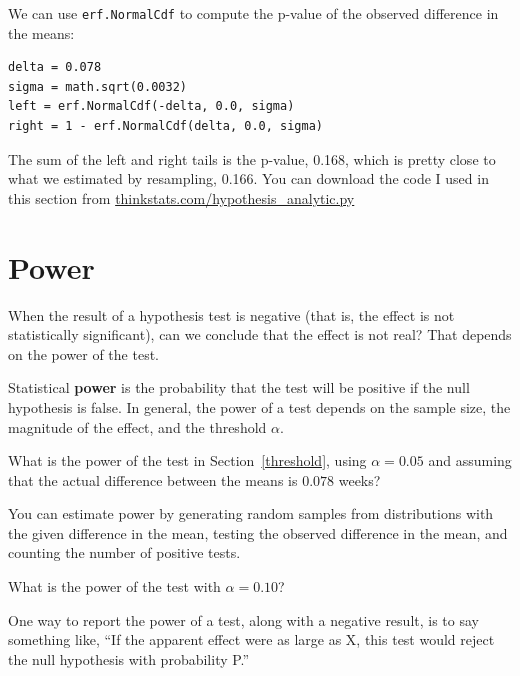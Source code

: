 \documentclass[12pt]{book}
\begin{document}

We can use {\tt erf.NormalCdf} to compute the p-value of the observed 
difference in the means:

\begin{verbatim}
delta = 0.078
sigma = math.sqrt(0.0032)
left = erf.NormalCdf(-delta, 0.0, sigma)
right = 1 - erf.NormalCdf(delta, 0.0, sigma)
\end{verbatim}

The sum of the left and right tails is the p-value, 0.168, which is
pretty close to what we estimated by resampling, 0.166. 
You can download the code I used in this section from
\url{thinkstats.com/hypothesis_analytic.py}



\section{Power}

When the result of a hypothesis test is negative (that is, the effect is
not statistically significant), can we conclude that the effect is not
real?  That depends on the power of the test.

Statistical {\bf power} is the probability that the test will be
positive if the null hypothesis is false.  In general, the power of a
test depends on the sample size, the magnitude of the effect, and the
threshold $\alpha$.

\begin{ex}

What is the power of the test in Section~\ref{threshold}, using
$\alpha=0.05$ and assuming that the actual difference between the
means is $0.078$ weeks?

You can estimate power by generating random samples from distributions
with the given difference in the mean, testing the observed difference
in the mean, and counting the number of positive tests.

What is the power of the test with $\alpha=0.10$?

\end{ex}

One way to report the power of a test, along with a negative result,
is to say something like, ``If the apparent effect were as large
as X, this test would reject the null hypothesis with probability P.''


\end{document}

